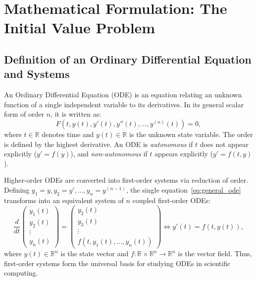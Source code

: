 \documentclass[runningheads]{llncs}
\begin{document}
\section{Mathematical Formulation: The Initial Value Problem}
\label{sec:ivp}
\subsection{Definition of an Ordinary Differential Equation and Systems}
An Ordinary Differential Equation (ODE) is an equation relating an unknown function of a single independent variable to its derivatives. In its general scalar form of order $n$, it is written as:
\begin{equation}
\label{eq:general_ode}
F\left(t, y(t), y'(t), y''(t), \dots, y^{(n)}(t)\right) = 0,
\end{equation}
where $t \in \mathbb{R}$ denotes time and $y(t) \in \mathbb{R}$ is the unknown state variable. The order is defined by the highest derivative. An ODE is \emph{autonomous} if $t$ does not appear explicitly ($y' = f(y)$), and \emph{non-autonomous} if $t$ appears explicitly ($y' = f(t, y)$).

Higher-order ODEs are converted into first-order systems via reduction of order. Defining $y_1 = y, y_2 = y', \dots, y_n = y^{(n-1)}$, the single equation~\eqref{eq:general_ode} transforms into an equivalent system of $n$ coupled first-order ODEs:
\begin{equation}
\label{eq:first_order_system}
\frac{d}{dt}\begin{pmatrix} y_1(t) \\ y_2(t) \\ \vdots \\ y_n(t) \end{pmatrix} = \begin{pmatrix} y_2(t) \\ y_3(t) \\ \vdots \\ f(t, y_1(t), \dots, y_n(t)) \end{pmatrix} \iff y'(t) = f(t, y(t)),
\end{equation}
where $y(t) \in \mathbb{R}^n$ is the state vector and $f : \mathbb{R} \times \mathbb{R}^n \to \mathbb{R}^n$ is the vector field. Thus, first-order systems form the universal basis for studying ODEs in scientific computing.
\end{document}
